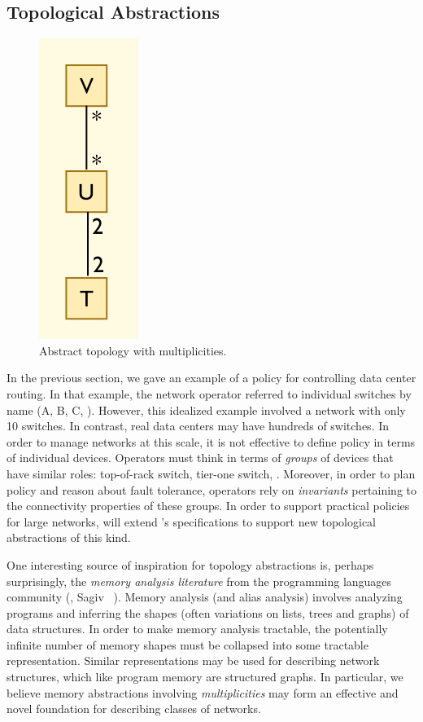\subsection{Topological Abstractions}

\begin{figure}
  \centering
  \includegraphics[width=.1\textwidth]{figures/abstract-topo}
\caption{Abstract topology with multiplicities.}
  \label{fig:abstract-topo}
  \vspace{-1em}
\end{figure}

In the previous section, we gave an example of a \Propane policy for
controlling data center routing.  In that example, the network operator
referred to individual switches by name (A, B, C, \etc).  However,
this idealized example involved a network with only 10 switches.  In
contrast, real data centers may have hundreds of switches.  In order to
manage networks at this scale, it is not effective to define policy in
terms of individual devices.  Operators must think 
in terms of \emph{groups} of devices that have similar roles:  top-of-rack switch,
tier-one switch, \etc.  Moreover, in order to plan policy and reason about
fault tolerance, operators rely on \emph{invariants} pertaining to the 
connectivity properties of these groups.  
In order to support practical policies for large networks, \Name will extend
\Propane's specifications to support
new topological abstractions of this kind.

One interesting source of inspiration for topology abstractions is,
perhaps surprisingly, the
\emph{memory analysis literature} from the programming languages 
community (\eg, Sagiv \etal~\cite{sagiv+:shape-analysis}).
Memory analysis (and alias analysis) involves analyzing programs
and inferring the shapes (often variations on lists, trees and graphs)
of data structures.  In order to make memory analysis tractable, 
the potentially infinite number of memory shapes must be collapsed into
some tractable representation.  Similar representations may be used for
describing network structures, which like program memory are structured
graphs. In particular, we believe memory
abstractions involving \emph{multiplicities} may form an effective and
novel foundation for describing classes of networks. 

